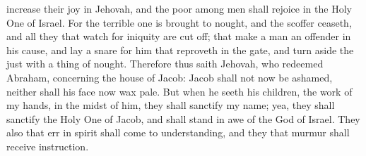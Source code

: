 increase their joy in Jehovah, and the poor among men shall rejoice in the Holy One of Israel. For the terrible one is brought to nought, and the scoffer ceaseth, and all they that watch for iniquity are cut off; that make a man an offender in his cause, and lay a snare for him that reproveth in the gate, and turn aside the just with a thing of nought.  Therefore thus saith Jehovah, who redeemed Abraham, concerning the house of Jacob: Jacob shall not now be ashamed, neither shall his face now wax pale. But when he seeth his children, the work of my hands, in the midst of him, they shall sanctify my name; yea, they shall sanctify the Holy One of Jacob, and shall stand in awe of the God of Israel. They also that err in spirit shall come to understanding, and they that murmur shall receive instruction. 

